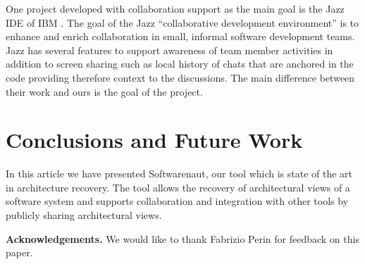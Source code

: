 \documentclass[preprint,12pt]{elsarticle}
\begin{document}
One project developed with collaboration support as the main goal is the Jazz IDE of IBM \cite{hupfer-jazz}. The goal of the Jazz ``collaborative development environment'' is to enhance and enrich collaboration in small, informal software development teams. Jazz has several features to support awareness of team member activities in addition to screen sharing such as local history of chats that are anchored in the code providing therefore context to the discussions. The main difference between their work and ours is the goal of the project.





\section {Conclusions and Future Work}
\label {sec:conc}

In this article we have presented Softwarenaut, our tool which is state of the art in architecture recovery. The tool allows the recovery of architectural views of a software system and supports collaboration and integration with other tools by publicly sharing architectural views.

\vspace{0.5cm}
\footnotesize
{\bf Acknowledgements.} We would like to thank Fabrizio Perin for feedback on this paper.



\newpage

\footnotesize





%
\end{document}
